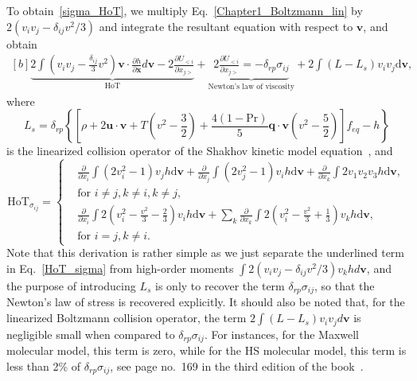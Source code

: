 To obtain~\eqref{sigma_HoT}, we multiply Eq.~\eqref{Chapter1_Boltzmann_lin} by $2(v_iv_j-\delta_{ij}v^2/3)$ and integrate the resultant equation with respect to $\bm{v}$, and obtain 
\begin{equation}\label{HoT_sigma}
\begin{aligned}[b]
\underbrace{2\int{(v_iv_j-\frac{\delta_{ij}}{3}v^2)} \textbf{v}\cdot\frac{\partial h}{\partial \textbf{x}}d\textbf{v}-2\frac{\partial{U_{<i}}}{\partial {x_{j>}}}}_{\text{HoT}}
+\underbrace{2\frac{\partial{U_{<i}}}{\partial {x_{j>}}}=-\delta_{rp}\sigma_{ij}}_{\text{Newton's law of viscosity}}+2\int{(L-L_s)v_iv_j}\mathrm{d}\bm{v},
\end{aligned}
\end{equation}
where
\begin{equation}\label{LBE_shakhov}
L_{s}=\delta_{rp}\left\{\left[\rho+2\bm{u}\cdot\bm{v}+T\left(v^2-\frac{3}{2}\right)+\frac{4\left(1-\mathrm{Pr}\right)}{5}\bm{q}\cdot{\bm{v}}\left(v^2-\frac{5}{2}\right)\right]f_{eq}-h\right\}
\end{equation} is the linearized collision operator of the Shakhov kinetic model equation~\cite{Shakhov1968}, and 
\begin{equation}\label{HoT_sigma2}
\text{HoT}_{\sigma_{ij}}=
\begin{cases}
& \frac{\partial}{\partial x_i}\int{}(2v_i^2-1)v_jh\mathrm{d}\bm{v}
+\frac{\partial}{\partial x_j}\int{}(2v_j^2-1)v_ih\mathrm{d}\bm{v}
+\frac{\partial}{\partial x_k}\int{}2v_1v_2v_3h\mathrm{d}\bm{v}, \\
& \text{for~} i\neq{j}, k\neq{i}, k\neq{j}, \\
& \frac{\partial}{\partial x_i}\int{}2(v_i^2-\frac{v^2}{3}-\frac{2}{3})v_ih\mathrm{d}\bm{v}
+\sum_{k}\frac{\partial}{\partial x_k}\int{}2(v_i^2-\frac{v^2}{3}+\frac{1}{3})v_kh\mathrm{d}\bm{v}, \\
& \text{for~} i=j, k\neq{i}. 
\end{cases}
\end{equation}
Note that this derivation is rather simple as we just separate the underlined term in Eq.~\eqref{HoT_sigma} from high-order moments $\int{}2(v_iv_j-\delta_{ij}v^2/3)v_khd\bm{v}$, and the purpose of introducing $L_s$ is only to recover the term
$\delta_{rp}\sigma_{ij}$, so that the Newton's law of stress is recovered explicitly. It should also be noted that, for the linearized Boltzmann collision operator, the term $2\int{(L-L_s)v_iv_j} d\bm{v}$ is negligible small when compared to $\delta_{rp}\sigma_{ij}$. For instances, for the Maxwell molecular model, this term is zero, while for the HS molecular model, this term is less than 2\% of $\delta_{rp}\sigma_{ij}$, see page no.~169 in the third edition of the book~\cite{CE}.



